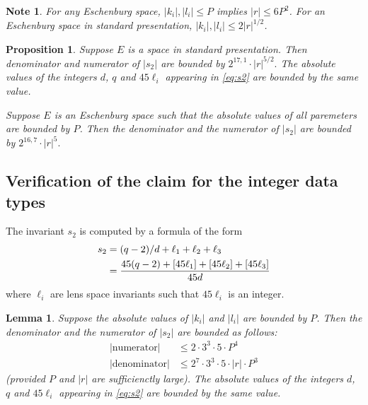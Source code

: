 \documentclass{article}
\newtheorem{lem}[thm]{Lemma}
\newtheorem{prop}[thm]{Proposition}
\newtheorem{note}[thm]{Note}
\newcommand{\abs}[1]{\left|#1\right|}
\begin{document}
\begin{note}\label{lem:P-vs-R}
  For any Eschenburg space, 
  \(\abs{k_i}, \abs{l_i} \leq P\) implies \(\abs{r} \leq 6 P^2\).
  For an Eschenburg space in standard presentation, \(\abs{k_i}, \abs{l_i} \leq 2\abs{r}^{1/2}\).
\end{note}


{\color{gray}
\begin{prop}
  Suppose \(E\) is a space in standard presentation.
  Then denominator and numerator of \(\abs{s_2}\) are bounded by 
  \(
      2^{17,1}·\abs{r}^{5/2}.
  \)
  The absolute values of the integers \(d\), \(q\) and \(45\ell_i\) appearing in \eqref{eq:s2} are bounded by the same value.

  Suppose \(E\) is an Eschenburg space such that the absolute values of all paremeters are bounded by \(P\).  Then the denominator and the numerator of \(\abs{s_2}\) are bounded by 
  \(
    2^{16,7}·\abs{r}^{5}.
  \)
\end{prop}
}


\subsection{Verification of the claim for the integer data types}
The invariant \(s_2\) is computed by a formula of the form
\begin{align}\label{eq:s2}
  \notag  s_2   &= (q-2)/d + \ell_1 + \ell_2 + \ell_3\\
                &= \frac{45(q-2) + [45\ell_1] + [45\ell_2] + [45\ell_3]}{45d}
\end{align}  
where \(\ell_i\) are lens space invariants such that \(45\ell_i\) is an integer.  

\begin{lem}\label{lem:s2}
  Suppose the absolute values of \(\abs{k_i}\) and \(\abs{l_i}\) are bounded by \(P\).  Then  the denominator and the numerator of \(\abs{s_2}\) are bounded as follows:
  \begin{align*}
    \abs{\text{numerator}}   &\leq 2·3^3·5·P^4\\
    \abs{\text{denominator}} &\leq 2^7·3^3·5·\abs{r}·P^3
  \end{align*}
  (provided \(P\) and \(\abs{r}\) are sufficienctly large).  The absolute values of the integers \(d\), \(q\) and \(45\ell_i\) appearing in \eqref{eq:s2} are bounded by the same value.
\end{lem}
 
\end{document}

